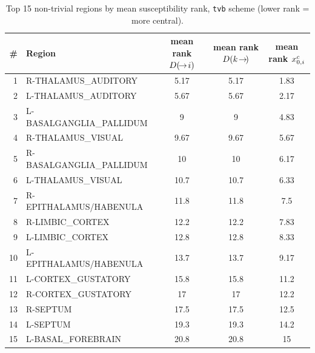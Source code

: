 \begin{table}[H]\centering\small
\caption{Top 15 non-trivial regions by mean susceptibility rank, \texttt{tvb} scheme (lower rank = more central).}
\begin{tabular}{@{}rlccc@{}}\toprule
\# & Region & mean rank $D(\!\to\! i)$ & mean rank $D(k\!\to\!)$ & mean rank $x_{0,i}^{c}$ \\\midrule
1 & R-THALAMUS\_AUDITORY & 5.17 & 5.17 & 1.83 \\
2 & L-THALAMUS\_AUDITORY & 5.67 & 5.67 & 2.17 \\
3 & L-BASALGANGLIA\_PALLIDUM & 9 & 9 & 4.83 \\
4 & R-THALAMUS\_VISUAL & 9.67 & 9.67 & 5.67 \\
5 & R-BASALGANGLIA\_PALLIDUM & 10 & 10 & 6.17 \\
6 & L-THALAMUS\_VISUAL & 10.7 & 10.7 & 6.33 \\
7 & R-EPITHALAMUS/HABENULA & 11.8 & 11.8 & 7.5 \\
8 & R-LIMBIC\_CORTEX & 12.2 & 12.2 & 7.83 \\
9 & L-LIMBIC\_CORTEX & 12.8 & 12.8 & 8.33 \\
10 & L-EPITHALAMUS/HABENULA & 13.7 & 13.7 & 9.17 \\
11 & L-CORTEX\_GUSTATORY & 15.8 & 15.8 & 11.2 \\
12 & R-CORTEX\_GUSTATORY & 17 & 17 & 12.2 \\
13 & R-SEPTUM & 17.5 & 17.5 & 12.5 \\
14 & L-SEPTUM & 19.3 & 19.3 & 14.2 \\
15 & L-BASAL\_FOREBRAIN & 20.8 & 20.8 & 15 \\
\bottomrule\end{tabular}\end{table}

